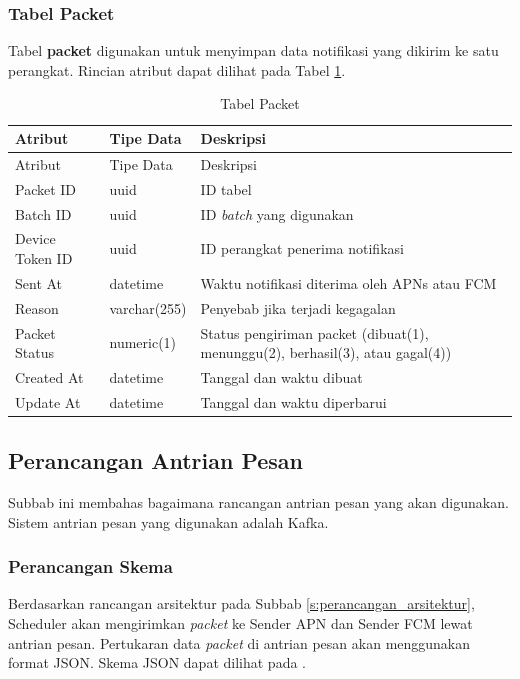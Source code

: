 \subsubsection{Tabel Packet} \label{s:tabel_packet}
\par Tabel \textbf{packet} digunakan untuk menyimpan data notifikasi yang dikirim ke satu perangkat. Rincian atribut dapat dilihat pada Tabel \ref{tabel_packet}.
\begin{longtable}{|p{2cm}|p{2.5cm}|p{4.5cm}|}
	\caption{Tabel Packet} \label{tabel_packet} \\ \hline
	\rowcolor{lightgray} {Atribut} & {Tipe Data} & {Deskripsi} \\ \hline
	\endfirsthead
	\hline
	\rowcolor{lightgray} {Atribut} & {Tipe Data} & {Deskripsi} \\ \hline
	\endhead
	Packet ID & uuid & ID tabel \\ \hline
	Batch ID & uuid & ID \textit{batch} yang digunakan \\ \hline
	Device Token ID & uuid & ID perangkat penerima notifikasi \\ \hline
	Sent At & datetime & Waktu notifikasi diterima oleh APNs atau FCM \\ \hline
	Reason & varchar(255) & Penyebab jika terjadi kegagalan \\ \hline
	Packet Status & numeric(1) & Status pengiriman packet (dibuat(1), menunggu(2), berhasil(3), atau gagal(4)) \\ \hline
	Created At & datetime & Tanggal dan waktu dibuat \\ \hline
	Update At & datetime & Tanggal dan waktu diperbarui \\ \hline
\end{longtable}

\subsection{Perancangan Antrian Pesan}
\par Subbab ini membahas bagaimana rancangan antrian pesan yang akan digunakan. Sistem antrian pesan yang digunakan adalah Kafka.

\subsubsection{Perancangan Skema}
\par Berdasarkan rancangan arsitektur pada Subbab \ref{s:perancangan_arsitektur}, Scheduler akan mengirimkan \textit{packet} ke Sender APN dan Sender FCM lewat antrian pesan. Pertukaran data \textit{packet} di antrian pesan akan menggunakan format JSON. Skema JSON dapat dilihat pada .

